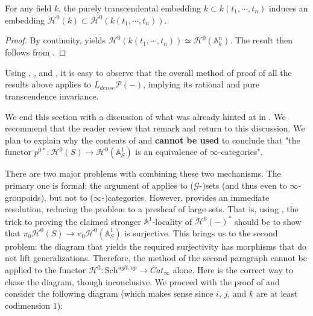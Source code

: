 \begin{cor}\label{trans}
For any field $k$, the purely transcendental embedding $k\subset k(t_1,\cdots,t_n)$ induces an embedding $\mathcal{H}^0(k)\subset \mathcal{H}^0(k(t_1,\cdots,t_n))$.
\end{cor}
\begin{proof}
    By continuity,  yields $\mathcal{H}^0(k(t_1,\cdots,t_n))\simeq \mathcal{H}^0(\mathbb{A}^n_k)$. The result then follows from .
\end{proof}
\begin{rem}
   Using , , and , it is easy to observe that the overall method of proof of all the results above applies to $L_{dense}\mathcal{P}(-)$, implying its rational and pure transcendence invariance.
\end{rem}
We end this section with a discussion of what was already hinted at in . We recommend that the reader review that remark and return to this discussion. We plan to explain why the contents of  and \textbf{ cannot be used} to conclude that "the functor $p^{0*}:\mathcal{H}^0(S)\to \mathcal{H}^0(\mathbb{A}^1_S)$ is an equivalence of $\infty$-categories".

There are two major problems with combining these two mechanisms. The primary one is formal: the argument of  applies to ($\mathcal{G}$-)sets (and thus even to $\infty$-groupoids), but not to ($\infty$-)categories. However,  provides an immediate resolution, reducing the problem to a presheaf of large sets. That is, using , the trick to proving the claimed stronger $\mathbb{A}^1$-locality of $\mathcal{H}^0(-)^*$ should be to show that $\pi_0\mathcal{H}^0(S)\to \pi_0\mathcal{H}^0(\mathbb{A}^1_S)$ is surjective. This brings us to the second problem: the diagram that yields the required surjectivity has morphisms that do not lift generalizations. Therefore, the method of the second paragraph cannot be applied to the functor $\mathcal{H}^0: \mathrm{Sch}^{uglt,op}\to Cat_{\infty}$ alone. Here is the correct way to chase the diagram, though inconclusive. We proceed with the proof of  and consider the following diagram (which makes sense since $i$, $j$, and $k$ are at least codimension $1$):

